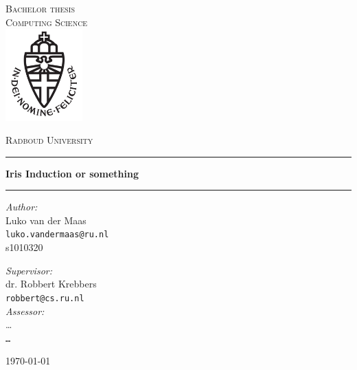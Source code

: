 \documentclass[11pt,a4paper]{report}
\begin{document}
\renewcommand{\sectionautorefname}{Section}
\renewcommand{\subsectionautorefname}{Section}
\renewcommand{\chapterautorefname}{Chapter}

\begin{titlepage}
  \begin{center}
    \textsc{\LARGE Bachelor thesis\\Computing Science}\\[1.5cm]
    \includegraphics[height=100pt]{logo}

    \vspace{0.4cm}
    \textsc{\Large Radboud University}\\[1cm]
    \hrule
    \vspace{0.4cm}
    \textbf{\huge Iris Induction or something}\\[0.4cm]
    \hrule
    \vspace{2cm}
    \begin{minipage}[t]{0.45\textwidth}
      \begin{flushleft} \large
        \textit{Author:}\\
        Luko van der Maas\\
        \texttt{luko.vandermaas@ru.nl}\\
        s1010320
      \end{flushleft}
    \end{minipage}
    \begin{minipage}[t]{0.45\textwidth}
      \begin{flushright} \large
        \textit{Supervisor:}\\
        dr. Robbert Krebbers\\
        \texttt{robbert@cs.ru.nl}\\[1.3cm]
        \textit{Assessor:}\\
        \dots\\
        \texttt{\dots}
      \end{flushright}
    \end{minipage}
    \vfill
    {\large \today}
  \end{center}
\end{titlepage}



\tableofcontents




\printbibliography

\newpage
\mbox{}
\thispagestyle{empty}
\newpage
\mbox{}
\thispagestyle{empty}
\end{document}
